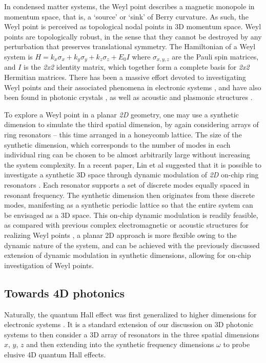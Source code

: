In condensed matter systems, the Weyl point describes a magnetic monopole in momentum space, that is, a `source' or `sink' of Berry curvature. As such, the Weyl point is perceived as topological nodal points in 3D momentum space. Weyl points are topologically robust, in the sense that they cannot be destroyed by any perturbation that preserves translational symmetry. The Hamiltonian of a Weyl system is
$H=k_x \sigma_x+k_y \sigma_y+k_z \sigma_z+E_0 I$
where $\sigma_{x,y,z}$ are the Pauli spin matrices, and $I$ is the \textit{2x2} identity matrix, which together form a complete basis for \textit{2x2} Hermitian matrices. There has been a massive effort devoted to investigating Weyl points and their associated phenomena in electronic systems \cite{Gupta2017,Spivak2016}, and have also been found in photonic crystals \cite{Noh2017,Xiao2016}, as well as acoustic \cite{Yang2016a} and plasmonic structures \cite{Gao2016}. 

To explore a Weyl point in a planar \textit{2D} geometry, one may use a synthetic dimension to simulate the third spatial dimension, by again considering arrays of ring resonators – this time arranged in a honeycomb lattice. The size of the synthetic dimension, which corresponds to the number of modes in each individual ring can be chosen to be almost arbitrarily large without increasing the system complexity. In a recent paper, Lin et al suggested that it is possible to investigate a synthetic 3D space through dynamic modulation of \textit{2D} on-chip ring resonators \cite{Lin2017}. Each resonator supports a set of discrete modes equally spaced in resonant frequency. The synthetic dimension then originates from these discrete modes, manifesting as a synthetic periodic lattice so that the entire system can be envisaged as a 3D space. This on-chip dynamic modulation is readily feasible, as compared with previous complex electromagnetic or acoustic structures for realizing Weyl points \cite{Lu2015,Rechtsman2013}, a planar 2D approach is more flexible owing to the dynamic nature of the system, and can be achieved with the previously discussed extension of dynamic modulation in synthetic dimensions, allowing for on-chip investigation of Weyl points. 

\subsection{Towards 4D photonics}
Naturally, the quantum Hall effect was first generalized to higher dimensions for electronic systems \cite{Zhang2001}. It is a standard extension of our discussion on 3D photonic systems to then consider a 3D array of resonators in the three spatial dimensions $x$, $y$, $z$ and then extending into the synthetic frequency dimensions $\omega$ to probe elusive 4D quantum Hall effects.

